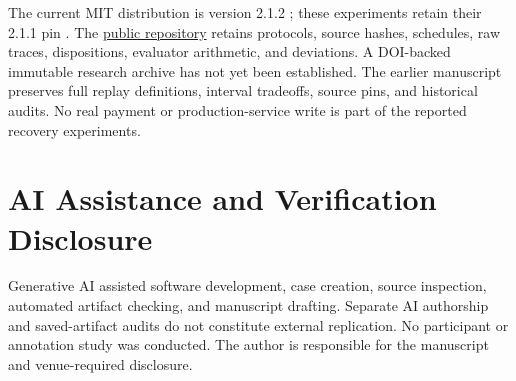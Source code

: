 \documentclass[conference]{IEEEtran}
\begin{document}
The current MIT distribution is version 2.1.2 \cite{currentrelease}; these experiments retain their 2.1.1 pin \cite{artifact}. The \href{https://github.com/Devrajsinh-Jhala/consequa-x}{public repository} retains protocols, source hashes, schedules, raw traces, dispositions, evaluator arithmetic, and deviations. A DOI-backed immutable research archive has not yet been established. The earlier manuscript preserves full replay definitions, interval tradeoffs, source pins, and historical audits. No real payment or production-service write is part of the reported recovery experiments.

\section*{AI Assistance and Verification Disclosure}

Generative AI assisted software development, case creation, source inspection, automated artifact checking, and manuscript drafting. Separate AI authorship and saved-artifact audits do not constitute external replication. No participant or annotation study was conducted. The author is responsible for the manuscript and venue-required disclosure.
\end{document}
